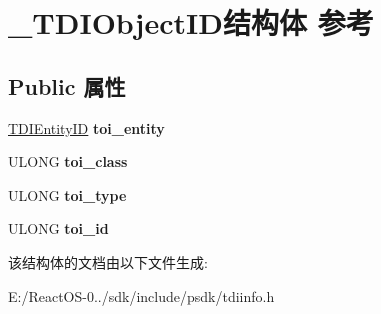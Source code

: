 \hypertarget{struct___t_d_i_object_i_d}{}\section{\+\_\+\+T\+D\+I\+Object\+I\+D结构体 参考}
\label{struct___t_d_i_object_i_d}
\subsection*{Public 属性}
\begin{DoxyCompactItemize}
\item 
\mbox{\label{struct___t_d_i_object_i_d_ab20b202798f1088494329f0c11de5d71}} 
\hyperlink{struct___t_d_i_entity_i_d}{T\+D\+I\+Entity\+ID} {\bfseries toi\+\_\+entity}
\item 
\mbox{\label{struct___t_d_i_object_i_d_a9ab49a28beb6bf2aca247a5e02486562}} 
U\+L\+O\+NG {\bfseries toi\+\_\+class}
\item 
\mbox{\label{struct___t_d_i_object_i_d_a2f13a7aad12f367cc3fe30e367761f7a}} 
U\+L\+O\+NG {\bfseries toi\+\_\+type}
\item 
\mbox{\label{struct___t_d_i_object_i_d_a073ac2c44d1e270d5bd8326d73a2a4a0}} 
U\+L\+O\+NG {\bfseries toi\+\_\+id}
\end{DoxyCompactItemize}


该结构体的文档由以下文件生成\+:\begin{DoxyCompactItemize}
\item 
E\+:/\+React\+O\+S-\/0../sdk/include/psdk/tdiinfo.\+h\end{DoxyCompactItemize}
